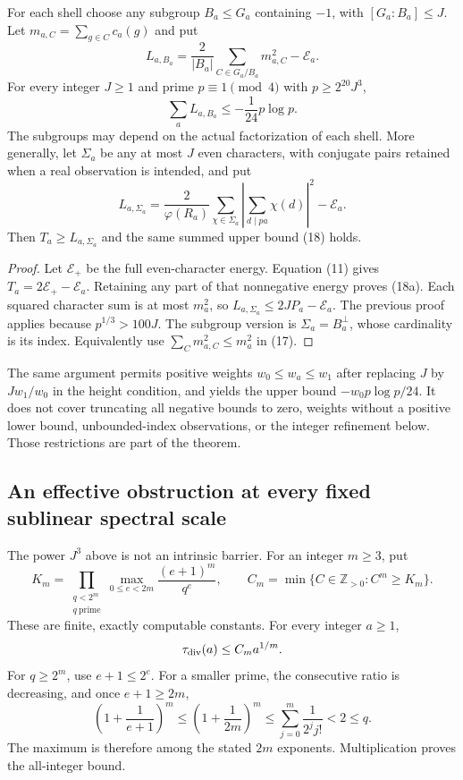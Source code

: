 \begin{corollary}\label{cor:index}
For each shell choose any subgroup $B_a\le G_a$ containing $-1$, with
$[G_a:B_a]\le J$. Let $m_{a,C}=\sum_{g\in C}c_a(g)$ and put
\[
 L_{a,B_a}=\frac2{|B_a|}\sum_{C\in G_a/B_a}m_{a,C}^2-\mathcal E_a.
                                                               \tag{17}
\]
For every integer $J\ge1$ and prime $p\equiv1\pmod4$ with $p\ge2^{20}J^3$,
\[
 \sum_a L_{a,B_a}\le-\frac1{24}p\log p.                 \tag{18}
\]
The subgroups may depend on the actual factorization of each shell.
More generally, let $\Sigma_a$ be any at most $J$ even characters, with conjugate
pairs retained when a real observation is intended, and put
\[
 L_{a,\Sigma_a}=\frac2{\varphi(R_a)}
 \sum_{\chi\in\Sigma_a}\left|\sum_{d\mid pa}\chi(d)\right|^2-\mathcal E_a.
                                                               \tag{18a}
\]
Then $T_a\ge L_{a,\Sigma_a}$ and the same summed upper bound (18) holds.
\end{corollary}
\begin{proof}
Let $\mathcal E_+$ be the full even-character energy. Equation (11) gives
$T_a=2\mathcal E_+-\mathcal E_a$. Retaining any part of that nonnegative energy
proves (18a). Each squared character sum is at most $m_a^2$, so
$L_{a,\Sigma_a}\le2JP_a-\mathcal E_a$. The previous proof applies because
$p^{1/3}>100J$. The subgroup version is $\Sigma_a=B_a^\perp$, whose cardinality
is its index. Equivalently use $\sum_Cm_{a,C}^2\le m_a^2$ in (17).
\end{proof}
The same argument permits positive weights $w_0\le w_a\le w_1$ after replacing
$J$ by $Jw_1/w_0$ in the height condition, and yields the upper bound
$-w_0p\log p/24$. It does not cover truncating all negative bounds to zero,
weights without a positive lower bound, unbounded-index observations, or the
integer refinement below. Those restrictions are part of the theorem.

\subsection{An effective obstruction at every fixed sublinear spectral scale}
The power $J^3$ above is not an intrinsic barrier. For an integer $m\ge3$, put
\[
 K_m=\prod_{\substack{q<2^m\\q\ \mathrm{prime}}}
       \max_{0\le e<2m}\frac{(e+1)^m}{q^e},\qquad
 C_m=\min\{C\in\mathbb Z_{>0}:C^m\ge K_m\}.             \tag{18b}
\]
These are finite, exactly computable constants. For every integer $a\ge1$,
\[
 \tau_{\rm div}(a)\le C_ma^{1/m}.
\]
For $q\ge2^m$, use $e+1\le2^e$. For a smaller prime, the consecutive ratio
is decreasing, and once $e+1\ge2m$,
\[
 \left(1+\frac1{e+1}\right)^m
 \le\left(1+\frac1{2m}\right)^m
 \le\sum_{j=0}^m\frac1{2^j j!}<2\le q.
\]
The maximum is therefore among the stated $2m$ exponents. Multiplication proves
the all-integer bound.

